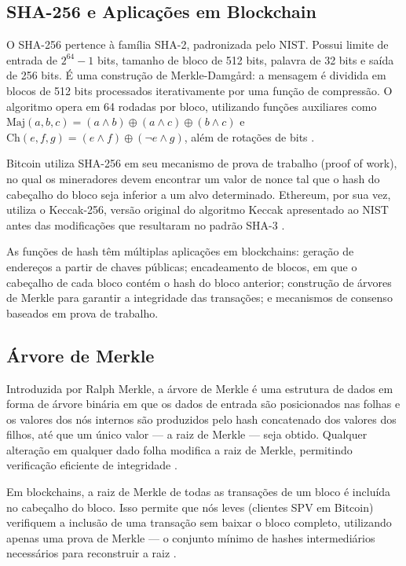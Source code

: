 \documentclass[12pt,a4paper]{report}
\begin{document}
\subsection{SHA-256 e Aplicações em Blockchain}

O SHA-256 pertence à família SHA-2, padronizada pelo NIST. Possui limite de entrada de $2^{64} - 1$ bits, tamanho de bloco de 512 bits, palavra de 32 bits e saída de 256 bits. É uma construção de Merkle-Damgård: a mensagem é dividida em blocos de 512 bits processados iterativamente por uma função de compressão. O algoritmo opera em 64 rodadas por bloco, utilizando funções auxiliares como $\text{Maj}(a,b,c) = (a \wedge b) \oplus (a \wedge c) \oplus (b \wedge c)$ e $\text{Ch}(e,f,g) = (e \wedge f) \oplus (\neg e \wedge g)$, além de rotações de bits \cite{Bashir2023}.

Bitcoin utiliza SHA-256 em seu mecanismo de prova de trabalho (proof of work), no qual os mineradores devem encontrar um valor de nonce tal que o hash do cabeçalho do bloco seja inferior a um alvo determinado. Ethereum, por sua vez, utiliza o Keccak-256, versão original do algoritmo Keccak apresentado ao NIST antes das modificações que resultaram no padrão SHA-3 \cite{Bashir2023}.

As funções de hash têm múltiplas aplicações em blockchains: geração de endereços a partir de chaves públicas; encadeamento de blocos, em que o cabeçalho de cada bloco contém o hash do bloco anterior; construção de árvores de Merkle para garantir a integridade das transações; e mecanismos de consenso baseados em prova de trabalho.

\subsection{Árvore de Merkle}

Introduzida por Ralph Merkle, a árvore de Merkle é uma estrutura de dados em forma de árvore binária em que os dados de entrada são posicionados nas folhas e os valores dos nós internos são produzidos pelo hash concatenado dos valores dos filhos, até que um único valor --- a raiz de Merkle --- seja obtido. Qualquer alteração em qualquer dado folha modifica a raiz de Merkle, permitindo verificação eficiente de integridade \cite{Bashir2023}.

Em blockchains, a raiz de Merkle de todas as transações de um bloco é incluída no cabeçalho do bloco. Isso permite que nós leves (clientes SPV em Bitcoin) verifiquem a inclusão de uma transação sem baixar o bloco completo, utilizando apenas uma prova de Merkle --- o conjunto mínimo de hashes intermediários necessários para reconstruir a raiz \cite{Bashir2023}.
\end{document}
